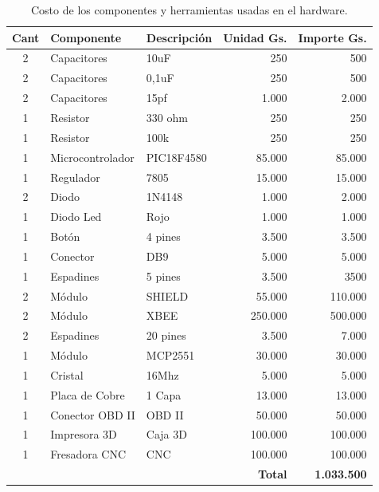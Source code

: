 \begin{table}[H]
\begin{center}
\begin{tabular}{c l l r r }
\toprule
\textbf{Cant} & \textbf{Componente} & \textbf{Descripción} &\textbf{Unidad Gs.}&\textbf{Importe Gs.}  \\ 
\midrule
2    & Capacitores      & 10uF        & 250            & 500   \\ 
2    & Capacitores      & 0,1uF       & 250            & 500   \\ 
2    & Capacitores      & 15pf        & 1.000           & 2.000  \\ 
1    & Resistor         & 330 ohm     & 250            & 250   \\ 
1    & Resistor         & 100k        & 250            & 250   \\ 
1    & Microcontrolador &PIC18F4580   & 85.000          & 85.000 \\ 
1    & Regulador        & 7805        & 15.000          & 15.000 \\ 
2    & Diodo            & 1N4148      & 1.000           & 2.000  \\ 
1    & Diodo Led        & Rojo        & 1.000           & 1.000  \\ 
1    & Botón            & 4 pines    & 3.500           & 3.500  \\ 
1    & Conector        & DB9    & 5.000           & 5.000  \\ 
1    & Espadines       & 5 pines   & 3.500           & 3500  \\ 
2    & Módulo          & SHIELD & 55.000          & 110.000 \\ 
2    & Módulo          & XBEE        & 250.000         & 500.000 \\ 
2    & Espadines       & 20 pines  & 3.500           & 7.000    \\ 
1    & Módulo          & MCP2551     & 30.000          & 30.000  \\ 
1    & Cristal         & 16Mhz     & 5.000           & 5.000   \\ 
1    & Placa de Cobre  & 1 Capa      & 13.000          & 13.000   \\ 
1    & Conector OBD II  & OBD II     & 50.000          & 50.000   \\ 
1    & Impresora 3D         & Caja 3D       & 100.000         & 100.000 \\ 
1    & Fresadora CNC    & CNC        & 100.000         & 100.000 \\ 
      &                  &            & \textbf{Total} & \textbf{1.033.500}  \\ 
      \bottomrule
\end{tabular}
\caption{Costo de los componentes y herramientas usadas en el hardware.}
\label{tabla:hw}
\end{center}
\end{table}

